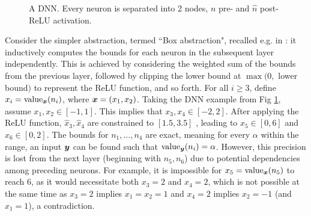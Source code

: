 \begin{figure}[t!]
	\caption{A DNN. Every neuron is separated into 2 nodes, 
	$n$ pre- and $\hat{n}$ post-ReLU activation.} 
	\label{fig1}
\end{figure}




Consider the simpler abstraction, termed ``Box abstraction", recalled e.g. in \cite{deeppoly}: it inductively computes the bounds for each neuron in the subsequent layer independently. This is achieved by considering the weighted sum of the bounds from the previous layer, followed by clipping the lower bound at $\max(0,$ lower bound$)$ to represent the ReLU function, and so forth. 
For all $i \geq 3$, define $x_i={\textrm{value}}_{{\bm{x}}}(n_i)$, where ${\bm{x}}=(x_1,x_2)$.
Taking the DNN example from Fig \ref{fig1}, assume $x_1,x_2 \in [-1,1]$. This implies that $x_3,x_4 \in [-2,2]$. After applying the ReLU function, $\hat{x}_3,\hat{x}_4$ are constrained to {$[1.5,3.5]$} , leading to $x_5 \in [0,6]$ and $x_6 \in [0,2]$. 
The bounds for $n_1, \ldots, n_4$ are exact, meaning for every $\alpha$ within the range, an input ${\bm{y}}$ can be found such that ${\textrm{value}}_{{\bm{y}}}(n_i)=\alpha$. However, this precision is lost from the next layer (beginning with $n_5, n_6$) due to potential dependencies among preceding neurons. For example, it is impossible for $x_5={\textrm{value}}_{{\bm{x}}}(n_5)$ to reach $6$, as it would necessitate both $x_3=2$ and $x_4=2$, which is not possible at the same time as 
$x_3=2$ implies $x_1=x_2=1$ and $x_4=2$ implies $x_2=-1$ (and $x_1=1$), a contradiction.


